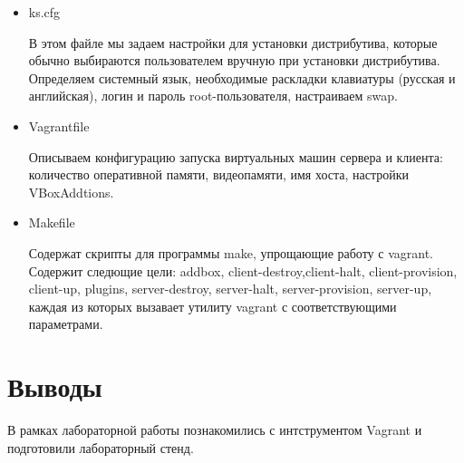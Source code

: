 \begin{enumerate}
\begin{itemize}
            \item ks.cfg

                В этом файле мы задаем настройки для установки дистрибутива, которые обычно выбираются пользователем вручную при установки дистрибутива. Определяем системный язык, необходимые раскладки клавиатуры (русская и английская), логин и пароль root-пользователя, настраиваем swap.
            \item Vagrantfile

                Описываем конфигурацию запуска виртуальных машин сервера и клиента: количество оперативной памяти, видеопамяти, имя хоста, настройки VBoxAddtions.
            \item Makefile

                Содержат скрипты для программы make, упрощающие работу с vagrant. Содержит следющие цели: addbox, client-destroy,client-halt, client-provision, client-up, plugins, server-destroy, server-halt, server-provision, server-up, каждая из которых вызавает утилиту vagrant с соответствующими параметрами.
        \end{itemize}

\end{enumerate}
\newpage
\section{Выводы}
В рамках лабораторной работы познакомились с интструментом Vagrant и подготовили лабораторный стенд.

